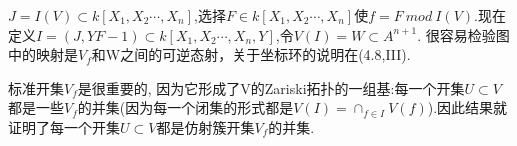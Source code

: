 \documentclass[UTF8]{book}
\begin{document}
$J=I(V)\subset k[X_{1},X_{2}\cdots,X_{n}]$,选择$F\in k[X_{1},X_{2}\cdots,X_{n}]$使$f=F \ mod \ I(V)$.现在定义$I=(J,YF-1)\subset k[X_{1},X_{2}\cdots,X_{n},Y]$,令$V(I)=W\subset A^{n+1}.$
很容易检验图中的映射是$V_{f}$和W之间的可逆态射，关于坐标环的说明在(4.8,III).

标准开集$V_{f}$是很重要的, 因为它形成了V的Zariski拓扑的一组基:每一个开集$U\subset V$都是一些$V_{f}$的并集(因为每一个闭集的形式都是$V(I)=\cap_{f \in I} V(f)$).因此结果就证明了每一个开集$U\subset V$都是仿射簇开集$V_{f}$的并集.


		
\end{document}

